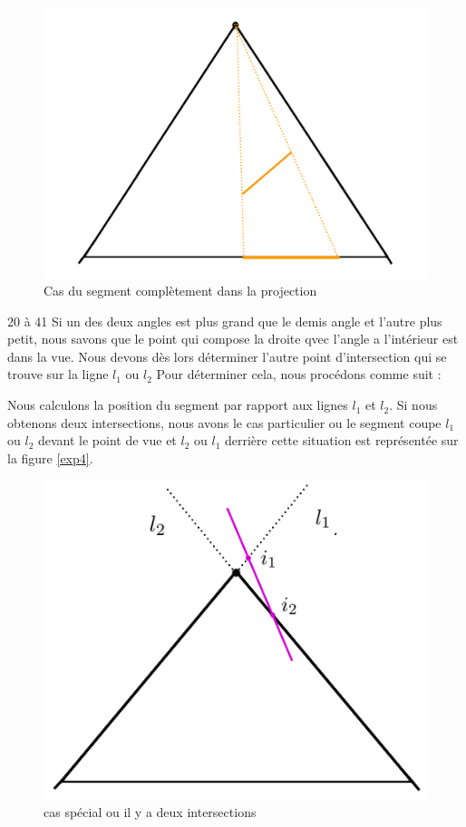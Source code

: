 \documentclass[11pt,a4paper]{article}
\theoremstyle{definition}
\theoremstyle{remark}
\begin{document}
\begin{figure}[H]
\centering
\includegraphics[scale=0.5]{cas1.png}
\caption{Cas du segment complètement dans la projection}
\label{cas1}
\end{figure}

20 à 41
Si un des deux angles est plus grand que le demis angle et l'autre plus petit, nous savons que le point qui compose la droite qvec l'angle a l'intérieur est dans la vue. Nous devons dès lors déterminer l'autre point d'intersection qui se trouve sur la ligne $l_1$ ou 
$l_2$ Pour déterminer cela, nous procédons comme suit :

Nous calculons la position du segment par rapport aux lignes $l_1$ et $l_2$. Si nous obtenons deux intersections, nous avons le cas particulier ou le segment coupe $l_1$ ou $l_2$ devant le point de vue et $l_2$ ou $l_1$ derrière cette situation est représentée sur la figure \ref{exp4}. 

\begin{figure}[H]
\centering
\includegraphics[scale=0.6]{casSpecial1.png}
\caption{cas spécial ou il y a deux intersections}
\label{exp_4}
\end{figure}
\end{document}
